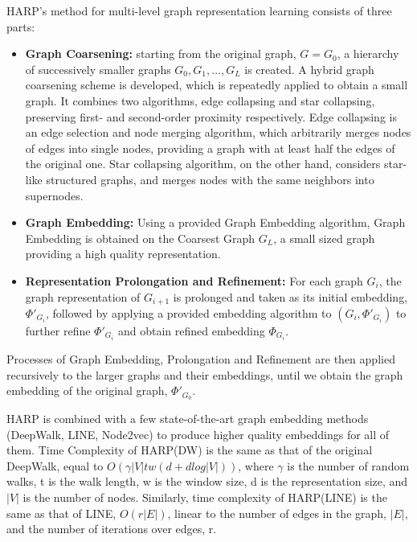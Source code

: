 HARP's method for multi-level graph representation learning consists of three parts: 
\begin{itemize}
    \item \textbf{Graph Coarsening:} starting from the original graph, $G = G_0$, a hierarchy of successively smaller graphs $G_0, G_1, \dots , G_L$ is created. A hybrid graph coarsening scheme is developed, which is repeatedly applied to obtain a small graph. It combines two algorithms, edge collapsing and star collapsing, preserving first- and second-order proximity respectively. Edge collapsing is an edge selection and node merging algorithm, which arbitrarily merges nodes of edges into single nodes, providing a graph with at least half the edges of the original one. Star collapsing algorithm, on the other hand, considers star-like structured graphs, and merges nodes with the same neighbors into supernodes.
    \item \textbf{Graph Embedding:}  Using a provided Graph Embedding algorithm, Graph Embedding is obtained on the Coarsest Graph $G_L$, a small sized graph providing a high quality representation. 
    \item \textbf{Representation Prolongation and Refinement:} For each graph $G_i$, the graph representation of $G_{i+1}$ is prolonged and taken as its initial embedding, $\Phi'_{G_i}$, followed by applying a provided embedding algorithm to $(G_i, \Phi'_{G_i})$ to further refine $\Phi'_{G_i}$ and obtain refined embedding $\Phi_{G_i}$. 
\end{itemize}

Processes of Graph Embedding, Prolongation and Refinement are then applied recursively to the larger graphs and their embeddings, until we obtain the graph embedding of the original graph, $\Phi'_{G_0}$.

HARP is combined with a few state-of-the-art graph embedding methods (DeepWalk, LINE, Node2vec) to produce higher quality embeddings for all of them.
Time Complexity of HARP(DW) is the same as that of the original DeepWalk, equal to $O(\gamma |V|tw (d+dlog|V|))$, where $\gamma$ is the number of random walks, t is the  walk length, w is the window size, d is the representation size, and $|V|$ is the number of nodes. Similarly, time complexity of HARP(LINE) is the same as that of LINE, $O(r|E|)$,  linear to the number of edges in the graph, $|E|$, and the number of iterations over edges, r.

